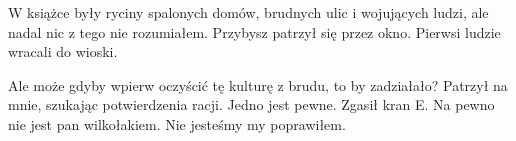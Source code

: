 W książce były ryciny spalonych domów, brudnych ulic i wojujących ludzi, ale nadal nic z tego nie rozumiałem.
Przybysz patrzył się przez okno. Pierwsi ludzie wracali do wioski.

\begin{dialogue}
\ds{} Ale może gdyby wpierw oczyścić tę kulturę z brudu, to by zadziałało? \dm{} Patrzył na mnie, szukając potwierdzenia racji.
\dm{} Jedno jest pewne. \dm{} Zgasił kran E. \dm{} Na pewno nie jest pan wilkołakiem.
\ds{} Nie jesteśmy my \dm{} poprawiłem.
\end{dialogue}













